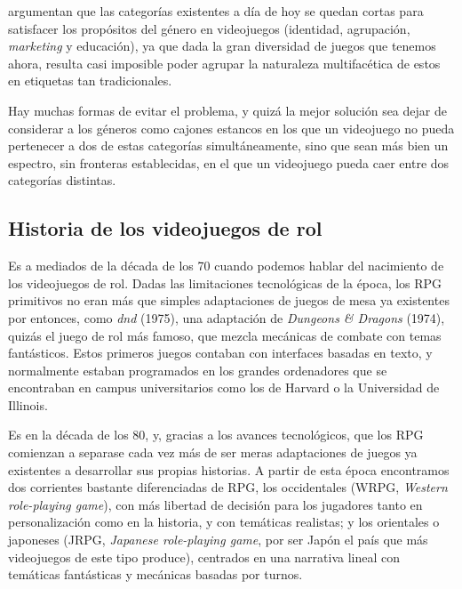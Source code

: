 \smallskip

\cite{FailGeneros} argumentan que las categorías existentes a día de hoy se quedan cortas para satisfacer los propósitos del género en videojuegos (identidad, agrupación, \textit{marketing} y educación), ya que dada la gran diversidad de juegos que tenemos ahora, resulta casi imposible poder agrupar la naturaleza multifacética de estos en etiquetas tan \guillemotleft tradicionales\guillemotright.

\smallskip

Hay muchas formas de evitar el problema, y quizá la mejor solución sea dejar de considerar a los géneros como \guillemotleft cajones estancos\guillemotright{} en los que un videojuego no pueda pertenecer a dos de estas categorías simultáneamente, sino que sean más bien un espectro, sin fronteras establecidas, en el que un videojuego pueda caer entre dos categorías distintas.

\subsection{Historia de los videojuegos de rol}
Es a mediados de la década de los 70 cuando podemos hablar del nacimiento de los videojuegos de rol. Dadas las limitaciones tecnológicas de la época, los RPG primitivos no eran más que simples adaptaciones de juegos de mesa ya existentes por entonces, como \textit{dnd} (1975), una adaptación de \textit{Dungeons \& Dragons} (1974), quizás el juego de rol más famoso, que mezcla mecánicas de combate con temas fantásticos. Estos primeros juegos contaban con interfaces basadas en texto, y normalmente estaban programados en los grandes ordenadores que se encontraban en campus universitarios como los de Harvard o la Universidad de Illinois.

\smallskip

Es en la década de los 80, y, gracias a los avances tecnológicos, que los RPG comienzan a separase cada vez más de ser meras adaptaciones de juegos ya existentes a desarrollar sus propias historias. A partir de esta época encontramos dos corrientes bastante diferenciadas de RPG, los \guillemotleft occidentales\guillemotright{} (WRPG, \textit{Western role-playing game}), con más libertad de decisión para los jugadores tanto en personalización como en la historia, y con temáticas realistas; y los \guillemotleft orientales\guillemotright{} o \guillemotleft japoneses\guillemotright{} (JRPG, \textit{Japanese role-playing game}, por ser Japón el país que más videojuegos de este tipo produce), centrados en una narrativa lineal con temáticas fantásticas y mecánicas basadas por turnos.

